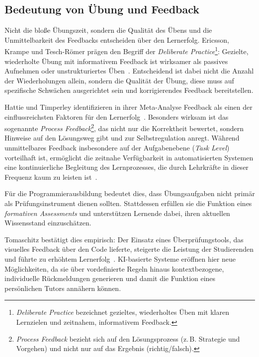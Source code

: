 \subsection{Bedeutung von Übung und Feedback}\label{subsec:uebung-feedback}

Nicht die bloße Übungszeit, sondern die Qualität des Übens und die Unmittelbarkeit des Feedbacks entscheiden über den Lernerfolg. Ericsson, Krampe und Tesch-Römer prägen den Begriff der \textit{Deliberate Practice}\footnote{\textit{Deliberate Practice} bezeichnet gezieltes, wiederholtes Üben mit klaren Lernzielen und zeitnahem, informativem Feedback.}: Gezielte, wiederholte Übung mit informativem Feedback ist wirksamer als passives Aufnehmen oder unstrukturiertes Üben~\cite{ericsson1993}. Entscheidend ist dabei nicht die Anzahl der Wiederholungen allein, sondern die Qualität der Übung, diese muss auf spezifische Schwächen ausgerichtet sein und korrigierendes Feedback bereitstellen.

Hattie und Timperley identifizieren in ihrer Meta-Analyse Feedback als einen der einflussreichsten Faktoren für den Lernerfolg~\cite{hattie2007}. Besonders wirksam ist das sogenannte \textit{Process Feedback}\footnote{\textit{Process Feedback} bezieht sich auf den Lösungsprozess (z.\,B. Strategie und Vorgehen) und nicht nur auf das Ergebnis (richtig/falsch).}, das nicht nur die Korrektheit bewertet, sondern Hinweise auf den Lösungsweg gibt und zur Selbstregulation anregt. Während unmittelbares Feedback insbesondere auf der Aufgabenebene (\textit{Task Level}) vorteilhaft ist, ermöglicht die zeitnahe Verfügbarkeit in automatisierten Systemen eine kontinuierliche Begleitung des Lernprozesses, die durch Lehrkräfte in dieser Frequenz kaum zu leisten ist~\cite{hattie2007}.

Für die Programmierausbildung bedeutet dies, dass Übungsaufgaben nicht primär als Prüfungs\-instrument dienen sollten. Stattdessen erfüllen sie die Funktion eines \textit{formativen Assessments} und unterstützen Lernende dabei, ihren aktuellen Wissensstand einzuschätzen.

Tomaschitz bestätigt dies empirisch: Der Einsatz eines Überprüfungstools, das visuelles Feedback über den Code lieferte, steigerte die Leistung der Studierenden und führte zu erhöhtem Lernerfolg~\cite{tomaschitz2020}. KI-basierte Systeme eröffnen hier neue Möglichkeiten, da sie über vordefinierte Regeln hinaus kontextbezogene, individuelle Rückmeldungen generieren und damit die Funktion eines persönlichen Tutors annähern können.


